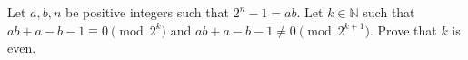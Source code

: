 Let $a,b,n$ be positive integers such that $2^n - 1 =ab$. Let $k \in \mathbb N$ such that $ab+a-b-1 \equiv 0 \pmod {2^k}$ and $ab+a-b-1 \neq 0 \pmod {2^{k+1}}$. Prove that $k$ is even.